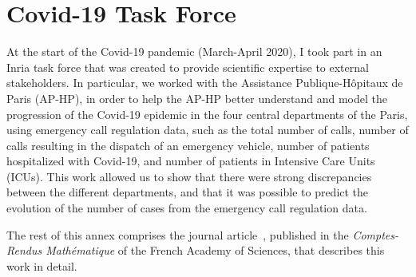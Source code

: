 \chapter{Covid-19 Task Force}
\label{chap:covid}

At the start of the Covid-19 pandemic (March-April 2020), I took part in an Inria task force that was created to provide scientific expertise to external stakeholders.
In particular, we worked with the Assistance Publique-Hôpitaux de Paris (AP-HP), in order to help the AP-HP better understand and model the progression of the Covid-19 epidemic in the four central departments of the Paris, using emergency call regulation data, such as the total number of calls, number of calls resulting in the dispatch of an emergency vehicle, number of patients hospitalized with Covid-19, and number of patients in Intensive Care Units (ICUs).
This work allowed us to show that there were strong discrepancies between the different departments, and that it was possible to predict the evolution of the number of cases from the emergency call regulation data.

The rest of this annex comprises the journal article~\citep{gaubert2020}, published in the \emph{Comptes-Rendus Mathématique} of the French Academy of Sciences, that describes this work in detail.


